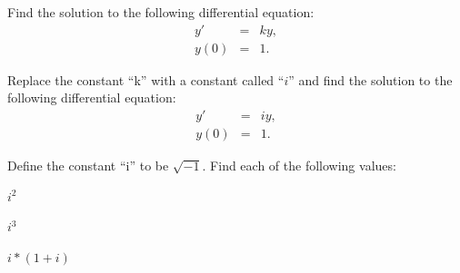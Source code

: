   \begin{problem}
  \item Find the solution to the following differential equation:
    \begin{eqnarray*}
      y' & = & k y, \\
      y(0) & = & 1.
    \end{eqnarray*}
    \vfill

  \item Replace the constant ``k'' with a constant called ``$i$'' and
    find the solution to the following differential equation:
    \begin{eqnarray*}
      y' & = & i y, \\
      y(0) & = & 1.
    \end{eqnarray*}
    \vfill


    \clearpage
  \item Define the constant ``i'' to be $\sqrt{-1}$. Find each of the
    following values:

    \begin{subproblem}
      \item $i^2$
        \vfill
      \item $i^3$
        \vfill
      \item $i*(1+i)$
        \vfill
    \end{subproblem}

  \end{problem}


